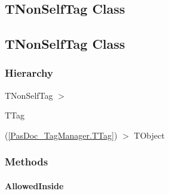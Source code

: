 \documentclass{report}
\begin{document}
\subsection*{\large{\textbf{TNonSelfTag Class}}\normalsize\hspace{1ex}\hrulefill}
\else
\subsection*{TNonSelfTag Class}
\fi
\label{PasDoc_TagManager.TNonSelfTag}
\subsubsection*{\large{\textbf{Hierarchy}}\normalsize\hspace{1ex}\hfill}
TNonSelfTag {$>$} \begin{ttfamily}TTag\end{ttfamily}(\ref{PasDoc_TagManager.TTag}) {$>$} 
TObject
\subsubsection*{\large{\textbf{Methods}}\normalsize\hspace{1ex}\hfill}
\paragraph*{AllowedInside}\hspace*{\fill}
\end{document}
